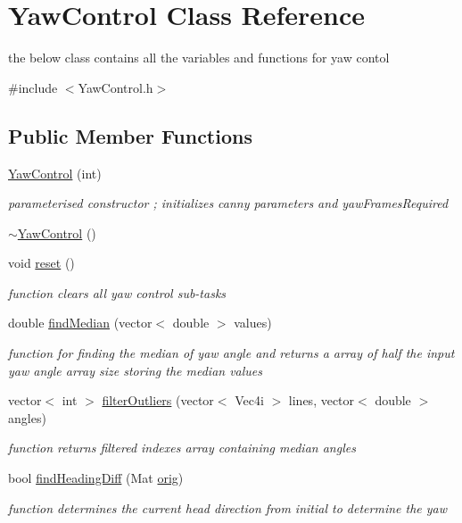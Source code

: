 \hypertarget{classYawControl}{}\section{Yaw\+Control Class Reference}
\label{classYawControl}


the below class contains all the variables and functions for yaw contol  




{\ttfamily \#include $<$Yaw\+Control.\+h$>$}

\subsection*{Public Member Functions}
\begin{DoxyCompactItemize}
\item 
\hyperlink{classYawControl_ae20ea5eaa17db8a70d6e8dce47fc9b8a}{Yaw\+Control} (int)
\begin{DoxyCompactList}\small\item\em parameterised constructor ; initializes canny parameters and yaw\+Frames\+Required \end{DoxyCompactList}\item 
\hyperlink{classYawControl_a7dfc515af1136d1a42f4b475f9615965}{$\sim$\+Yaw\+Control} ()
\item 
void \hyperlink{classYawControl_a312d3e7a6fbfcb1a47fcb6c2e192cd0b}{reset} ()
\begin{DoxyCompactList}\small\item\em function clears all yaw control sub-\/tasks \end{DoxyCompactList}\item 
double \hyperlink{classYawControl_a2272eb0423c4d58d91024398a1c344ee}{find\+Median} (vector$<$ double $>$ values)
\begin{DoxyCompactList}\small\item\em function for finding the median of yaw angle and returns a array of half the input yaw angle array size storing the median values \end{DoxyCompactList}\item 
vector$<$ int $>$ \hyperlink{classYawControl_a869bc2ed2eb11bac73af7b79e7ff07a2}{filter\+Outliers} (vector$<$ Vec4i $>$ lines, vector$<$ double $>$ angles)
\begin{DoxyCompactList}\small\item\em function returns filtered indexes array containing median angles \end{DoxyCompactList}\item 
bool \hyperlink{classYawControl_aca17af0cb08f59e1115ed5c43312d684}{find\+Heading\+Diff} (Mat \hyperlink{classYawControl_a462e793d0950d099f9744d72559f9471}{orig})
\begin{DoxyCompactList}\small\item\em function determines the current head direction from initial to determine the yaw \end{DoxyCompactList}\end{DoxyCompactItemize}
